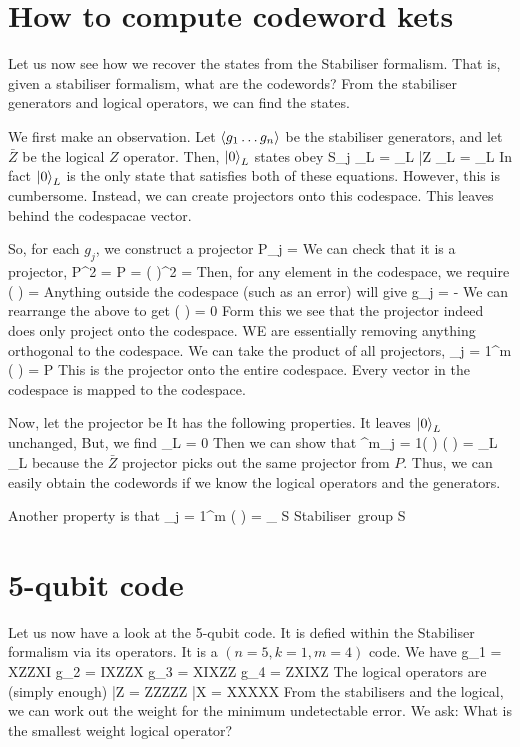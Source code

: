 \section{How to compute codeword kets}
Let us now see how we recover the states from the Stabiliser formalism. That is, given a stabiliser formalism, what are the codewords? From the stabiliser generators and logical operators, we can find the states. 

We first make an observation. Let $\left\langle g_1 \ldots g_n \right\rangle$ be the stabiliser generators, and let $\bar{Z}$ be the logical $Z$ operator. Then, $\ket{0}_L$ states obey
\beq
S_j _L = _L
\eeq
\beq
\bar{Z} _L = _L
\eeq
In fact $\ket{0}_L$ is the only state that satisfies both of these equations. However, this is cumbersome. Instead, we can create projectors onto this codespace. This leaves behind the codespacae vector. 

So, for each $g_j$, we construct a projector
\beq
P_j = 
\eeq
We can check that it is a projector, 
\beq
P^2 = P = \left(  \right)^2 = 
\eeq
Then, for any element in the codespace, we require
\beq
\left(  \right)  = 
\eeq
Anything outside the codespace (such as an error) will give
\beq
g_j \ket{\psi} = - \ket{\psi}
\eeq
We can rearrange the above to get
\beq
\left(  \right) \ket{\psi} = 0
\eeq
Form this we see that the projector indeed does only project onto the codespace. WE are essentially removing anything orthogonal to the codespace. We can take the product of all projectors, 
\beq
\prod_{j = 1}^m \left( \right) = P
\eeq
This is the projector onto the entire codespace. Every vector in the codespace is mapped to the codespace. 

Now, let the projector be 
\beq
{}
\eeq
It has the following properties. It leaves $\ket{0}_L$ unchanged, But, we find
\beq
{} _L = 0
\eeq
Then we can show that 
\beq
\prod^m_{j = 1}\left(  \right) \left(  \right) = _L _L
\eeq
because the $\bar{Z}$ projector picks out the same projector from $P$. Thus, we can easily obtain the codewords if we know the logical operators and the generators. 

Another property is that 
\beq
\prod_{j = 1}^m \left(  \right) =  \sum_{ \forall S \in \mbox{Stabiliser group} }S
\eeq

\section{5-qubit code}
Let us now have a look at the 5-qubit code. It is defied within the Stabiliser formalism via its operators. It is a $(n = 5, k= 1, m = 4)$ code. We have
\beq
g_1 = XZZXI
\eeq
\beq
g_2 = IXZZX
\eeq
\beq
g_3 = XIXZZ
\eeq
\beq
g_4 = ZXIXZ
\eeq
The logical operators are (simply enough)
\beq
\bar{Z} = ZZZZZ
\eeq
\beq
\bar{X} = XXXXX
\eeq
From the stabilisers and the logical, we can work out the weight for the minimum undetectable error. We ask: What is the smallest weight logical operator? 

